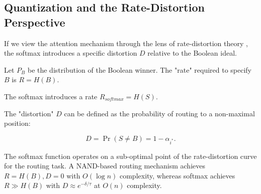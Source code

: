 \subsection{Quantization and the Rate-Distortion Perspective}













If we view the attention mechanism through the lens of rate-distortion theory \cite{shannon1948mathematical}, the softmax introduces a specific distortion $D$ relative to the Boolean ideal.






Let $P_B$ be the distribution of the Boolean winner. The "rate" required to specify $B$ is $R = H(B)$.






The softmax introduces a rate $R_{softmax} = H(S)$.






The "distortion" $D$ can be defined as the probability of routing to a non-maximal position:






\[






D = \Pr(S \neq B) = 1 - \alpha_{i^*}.






\]













\begin{conjecture}






\label{conj:rd-opt}






The softmax function operates on a sub-optimal point of the rate-distortion curve for the routing task. A NAND-based routing mechanism achieves $R = H(B), D = 0$ with $O(\log n)$ complexity, whereas softmax achieves $R \gg H(B)$ with $D \approx e^{-\delta/\tau}$ at $O(n)$ complexity.






\end{conjecture}













